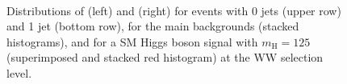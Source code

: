 \begin{figure}
\centering
{}
\\
\caption{Distributions of \MET (left) and \ptll (right) for events with 0 jets (upper row) and 1 jet (bottom row), for the main backgrounds (stacked histograms), and for a SM Higgs boson signal with $m_\mathrm{H}=125$\GeV (superimposed and stacked red histogram) at the WW selection level.}\label{fig:distr3}
\end{figure}

